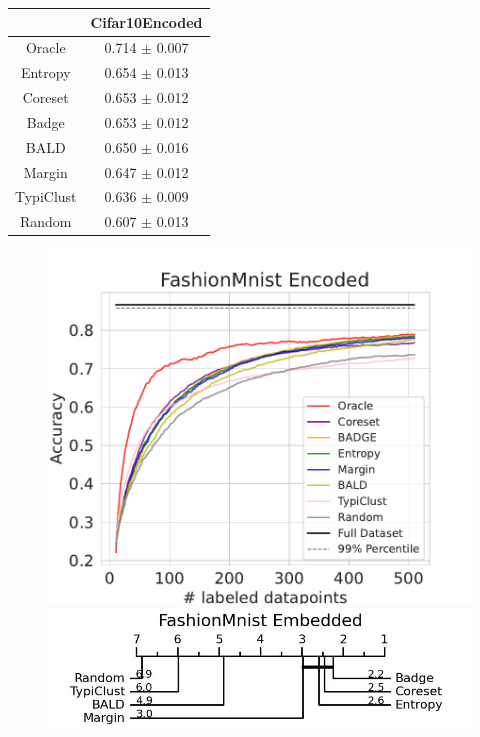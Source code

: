 \documentclass[]{article}
\begin{document}
\begin{minipage}{0.29\linewidth}
\begin{tabular}{c|c}
&Cifar10Encoded\\
\hline
Oracle&0.714 $\pm$ 0.007\\
Entropy&0.654 $\pm$ 0.013\\
Coreset&0.653 $\pm$ 0.012\\
Badge&0.653 $\pm$ 0.012\\
BALD&0.650 $\pm$ 0.016\\
Margin&0.647 $\pm$ 0.012\\
TypiClust&0.636 $\pm$ 0.009\\
Random&0.607 $\pm$ 0.013\\
\end{tabular}
\end{minipage}
\begin{minipage}{0.65\linewidth}
\begin{figure}[H]
    \centering
    \includegraphics[width=\linewidth]{img/eval_fmnist_enc} \\ [2mm]
\includegraphics[width=\linewidth]{img/micro_fmnist_enc.jpg} 
\end{figure}
\end{minipage}
\end{document}
